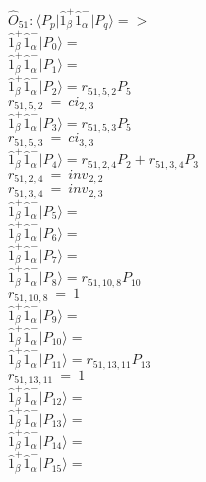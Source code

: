 \documentclass[14pt]{article}
\begin{document}
    $\hat{O}_{51}:  \langle{P_p}\vert \hat{1}_{\beta}^{+}\hat{1}_{\alpha}^{-} \vert{P_q}\rangle => $ \\ 
    $ \hat{1}_{\beta}^{+}\hat{1}_{\alpha}^{-} \vert{P_{0}}\rangle =  $ \\ 
    $ \hat{1}_{\beta}^{+}\hat{1}_{\alpha}^{-} \vert{P_{1}}\rangle =  $ \\ 
    $ \hat{1}_{\beta}^{+}\hat{1}_{\alpha}^{-} \vert{P_{2}}\rangle = {r}_{51,5,2}P_{5} $ \\ 
    ${r}_{51,5,2}\ =\ {ci}_{2,3} $ \\ 
    $ \hat{1}_{\beta}^{+}\hat{1}_{\alpha}^{-} \vert{P_{3}}\rangle = {r}_{51,5,3}P_{5} $ \\ 
    ${r}_{51,5,3}\ =\ {ci}_{3,3} $ \\ 
    $ \hat{1}_{\beta}^{+}\hat{1}_{\alpha}^{-} \vert{P_{4}}\rangle = {r}_{51,2,4}P_{2}+{r}_{51,3,4}P_{3} $ \\ 
    ${r}_{51,2,4}\ =\ {inv}_{2,2} $ \\ 
    ${r}_{51,3,4}\ =\ {inv}_{2,3} $ \\ 
    $ \hat{1}_{\beta}^{+}\hat{1}_{\alpha}^{-} \vert{P_{5}}\rangle =  $ \\ 
    $ \hat{1}_{\beta}^{+}\hat{1}_{\alpha}^{-} \vert{P_{6}}\rangle =  $ \\ 
    $ \hat{1}_{\beta}^{+}\hat{1}_{\alpha}^{-} \vert{P_{7}}\rangle =  $ \\ 
    $ \hat{1}_{\beta}^{+}\hat{1}_{\alpha}^{-} \vert{P_{8}}\rangle = {r}_{51,10,8}P_{10} $ \\ 
    ${r}_{51,10,8}\ =\ 1 $ \\ 
    $ \hat{1}_{\beta}^{+}\hat{1}_{\alpha}^{-} \vert{P_{9}}\rangle =  $ \\ 
    $ \hat{1}_{\beta}^{+}\hat{1}_{\alpha}^{-} \vert{P_{10}}\rangle =  $ \\ 
    $ \hat{1}_{\beta}^{+}\hat{1}_{\alpha}^{-} \vert{P_{11}}\rangle = {r}_{51,13,11}P_{13} $ \\ 
    ${r}_{51,13,11}\ =\ 1 $ \\ 
    $ \hat{1}_{\beta}^{+}\hat{1}_{\alpha}^{-} \vert{P_{12}}\rangle =  $ \\ 
    $ \hat{1}_{\beta}^{+}\hat{1}_{\alpha}^{-} \vert{P_{13}}\rangle =  $ \\ 
    $ \hat{1}_{\beta}^{+}\hat{1}_{\alpha}^{-} \vert{P_{14}}\rangle =  $ \\ 
    $ \hat{1}_{\beta}^{+}\hat{1}_{\alpha}^{-} \vert{P_{15}}\rangle =  $ \\ 
    
\end{document}
